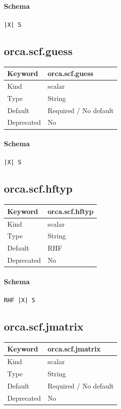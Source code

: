 \documentclass[11pt]{article}
\begin{document}
{{{{{\paragraph{Schema}
\begin{Verbatim}
|X| S
\end{Verbatim}

\subsection{orca.scf.guess}
\label{kw:orca-scf-guess}
\begin{longtable}{|p{1.5in}|p{4.5in}|}
\hline
Keyword & orca.scf.guess \\
\hline
Kind & scalar \\
\hline
Type & String \\
\hline
Default & Required / No default \\
\hline
Deprecated & No \\
\hline
\end{longtable}
\paragraph{Schema}
\begin{Verbatim}
|X| S
\end{Verbatim}

\subsection{orca.scf.hftyp}
\label{kw:orca-scf-hftyp}
\begin{longtable}{|p{1.5in}|p{4.5in}|}
\hline
Keyword & orca.scf.hftyp \\
\hline
Kind & scalar \\
\hline
Type & String \\
\hline
Default & RHF \\
\hline
Deprecated & No \\
\hline
\end{longtable}
\paragraph{Schema}
\begin{Verbatim}
RHF |X| S
\end{Verbatim}

\subsection{orca.scf.jmatrix}
\label{kw:orca-scf-jmatrix}
\begin{longtable}{|p{1.5in}|p{4.5in}|}
\hline
Keyword & orca.scf.jmatrix \\
\hline
Kind & scalar \\
\hline
Type & String \\
\hline
Default & Required / No default \\
\hline
Deprecated & No \\
\hline
\end{longtable}
}}}}}
\end{document}
